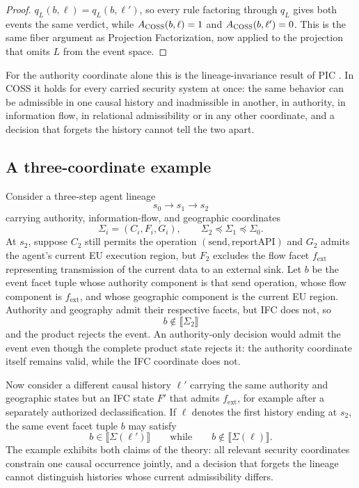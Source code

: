 \documentclass[10pt,twocolumn]{article}
\newcommand{\Model}{\textnormal{\textsc{COSS}}\xspace}
\newcommand{\sem}[1]{\llbracket #1 \rrbracket}
\newcommand{\state}{\Sigma}
\begin{document}
\begin{proof}
$q_L(b,\ell)=q_L(b,\ell')$, so every rule factoring through $q_L$ gives
both events the same verdict, while $A_{\Model}(b,\ell)=1$ and
$A_{\Model}(b,\ell')=0$. This is the same fiber argument as Projection
Factorization, now applied to the projection that omits $L$ from the event
space.
\end{proof}

For the authority coordinate alone this is the lineage-invariance result
of PIC \cite{gallo_poc2026}. In \Model it holds for every carried security
system at once: the same behavior can be admissible in one causal history
and inadmissible in another, in authority, in information flow, in
relational admissibility or in any other coordinate, and a decision that
forgets the history cannot tell the two apart.

\subsection{A three-coordinate example}
Consider a three-step agent lineage
\begin{equation}
  s_0\to s_1\to s_2
\end{equation}
carrying authority, information-flow, and geographic coordinates
\begin{equation}
  \state_i=(C_i,F_i,G_i),
  \qquad
  \state_2\preceq\state_1\preceq\state_0.
\end{equation}
At $s_2$, suppose $C_2$ still permits the operation
$(\mathrm{send},\mathrm{reportAPI})$ and $G_2$ admits the agent's current EU
execution region, but $F_2$ excludes the flow facet $f_{\mathrm{ext}}$
representing transmission of the current data to an external sink. Let $b$ be
the event facet tuple whose authority component is that send operation, whose
flow component is $f_{\mathrm{ext}}$, and whose geographic component is the
current EU region. Authority and geography admit their respective facets, but
IFC does not, so
\begin{equation}
  b\notin\sem{\state_2}
\end{equation}
and the product rejects the event. An authority-only decision would admit the
event even though the complete product state rejects it: the authority
coordinate itself remains valid, while the IFC coordinate does not.

Now consider a different causal history $\ell'$ carrying the same authority
and geographic states but an IFC state $F'$ that admits $f_{\mathrm{ext}}$,
for example after a separately authorized declassification. If $\ell$ denotes
the first history ending at $s_2$, the same event facet tuple $b$ may satisfy
\begin{equation}
  b\in\sem{\state(\ell')}
  \qquad\text{while}\qquad
  b\notin\sem{\state(\ell)}.
\end{equation}
The example exhibits both claims of the theory: all relevant security
coordinates constrain one causal occurrence jointly, and a decision that
forgets the lineage cannot distinguish histories whose current admissibility
differs.
\end{document}
